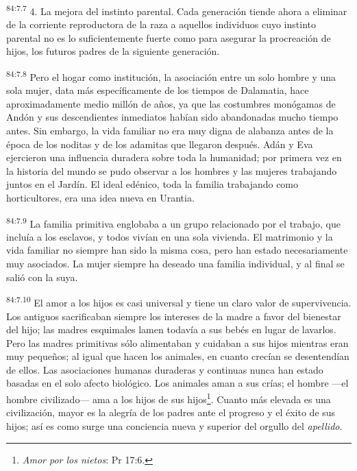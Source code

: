 \par
\textsuperscript{84:7.7} 4. La mejora del instinto parental. Cada generación tiende ahora a eliminar de la corriente reproductora de la raza a aquellos individuos cuyo instinto parental no es lo suficientemente fuerte como para asegurar la procreación de hijos, los futuros padres de la siguiente generación.

\par
\textsuperscript{84:7.8} Pero el hogar como institución, la asociación entre un solo hombre y una sola mujer, data más específicamente de los tiempos de Dalamatia, hace aproximadamente medio millón de años, ya que las costumbres monógamas de Andón y sus descendientes inmediatos habían sido abandonadas mucho tiempo antes. Sin embargo, la vida familiar no era muy digna de alabanza antes de la época de los noditas y de los adamitas que llegaron después. Adán y Eva ejercieron una influencia duradera sobre toda la humanidad; por primera vez en la historia del mundo se pudo observar a los hombres y las mujeres trabajando juntos en el Jardín. El ideal edénico, toda la familia trabajando como horticultores, era una idea nueva en Urantia.

\par
\textsuperscript{84:7.9} La familia primitiva englobaba a un grupo relacionado por el trabajo, que incluía a los esclavos, y todos vivían en una sola vivienda. El matrimonio y la vida familiar no siempre han sido la misma cosa, pero han estado necesariamente muy asociados. La mujer siempre ha deseado una familia individual, y al final se salió con la suya.

\par
\textsuperscript{84:7.10} El amor a los hijos es casi universal y tiene un claro valor de supervivencia. Los antiguos sacrificaban siempre los intereses de la madre a favor del bienestar del hijo; las madres esquimales lamen todavía a sus bebés en lugar de lavarlos. Pero las madres primitivas sólo alimentaban y cuidaban a sus hijos mientras eran muy pequeños; al igual que hacen los animales, en cuanto crecían se desentendían de ellos. Las asociaciones humanas duraderas y continuas nunca han estado basadas en el solo afecto biológico. Los animales aman a sus crías; el hombre ---el hombre civilizado--- ama a los hijos de sus hijos\footnote{\textit{Amor por los nietos}: Pr 17:6.}. Cuanto más elevada es una civilización, mayor es la alegría de los padres ante el progreso y el éxito de sus hijos; así es como surge una conciencia nueva y superior del orgullo del \textit{apellido}.

